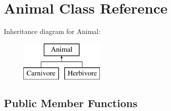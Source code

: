 \hypertarget{class_animal}{}\section{Animal Class Reference}
\label{class_animal}
Inheritance diagram for Animal\+:\begin{figure}[H]
\begin{center}
\leavevmode
\includegraphics[height=2.000000cm]{class_animal}
\end{center}
\end{figure}
\subsection*{Public Member Functions}
